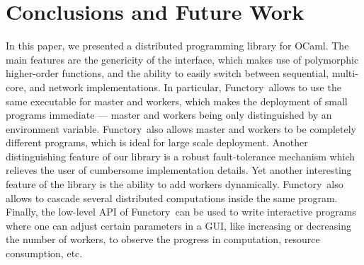 \documentclass{llncs}
\newcommand{\Ocaml}{OCaml}
\newcommand{\functory}{\textsf{Functory}}
\begin{document}
\section{Conclusions and Future Work}\label{sec:future}

In this paper, we presented a distributed programming library for
\Ocaml. The main features are the
genericity of the interface, which makes use of polymorphic
higher-order functions, and the ability to easily switch between
sequential, multi-core, and network implementations. In particular,
\functory\ allows to use the same executable for master and workers,
which makes the deployment of small programs immediate --- master and
workers being only distinguished by an environment
variable. \functory\ also allows master and workers to be completely
different programs, which is ideal for large scale deployment.
Another distinguishing feature of our library is a robust
fault-tolerance mechanism which relieves the user of cumbersome
implementation details.  Yet another interesting feature of the
library is the ability to add workers dynamically. \functory\
also allows to cascade several distributed computations inside the
same program.  Finally, the low-level API of \functory\ 
can be used to write interactive programs where one can adjust certain
parameters in a GUI, like increasing or decreasing the number of
workers, to observe the progress in computation, resource consumption, etc.
\end{document}
